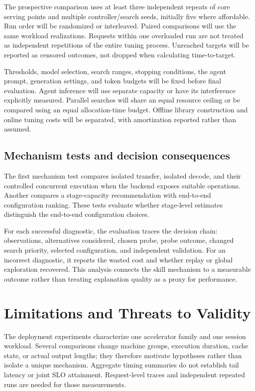 \documentclass[11pt,a4paper]{article}
\begin{document}
The prospective comparison uses at least three independent repeats of core serving points and multiple controller/search seeds, initially five where affordable. Run order will be randomized or interleaved. Paired comparisons will use the same workload realizations. Requests within one overloaded run are not treated as independent repetitions of the entire tuning process. Unreached targets will be reported as censored outcomes, not dropped when calculating time-to-target.

Thresholds, model selection, search ranges, stopping conditions, the agent prompt, generation settings, and token budgets will be fixed before final evaluation. Agent inference will use separate capacity or have its interference explicitly measured. Parallel searches will share an equal resource ceiling or be compared using an equal allocation-time budget. Offline library construction and online tuning costs will be separated, with amortization reported rather than assumed.

\subsection{Mechanism tests and decision consequences}
The first mechanism test compares isolated transfer, isolated decode, and their controlled concurrent execution when the backend exposes suitable operations. Another compares a stage-capacity recommendation with end-to-end configuration ranking. These tests evaluate whether stage-level estimates distinguish the end-to-end configuration choices.

For each successful diagnostic, the evaluation traces the decision chain: observations, alternatives considered, chosen probe, probe outcome, changed search priority, selected configuration, and independent validation. For an incorrect diagnostic, it reports the wasted cost and whether replay or global exploration recovered. This analysis connects the skill mechanism to a measurable outcome rather than treating explanation quality as a proxy for performance.



\section{Limitations and Threats to Validity}
The deployment experiments characterize one accelerator family and one session workload. Several comparisons change machine groups, execution duration, cache state, or actual output lengths; they therefore motivate hypotheses rather than isolate a unique mechanism. Aggregate timing summaries do not establish tail latency or joint SLO attainment. Request-level traces and independent repeated runs are needed for those measurements.
\end{document}
